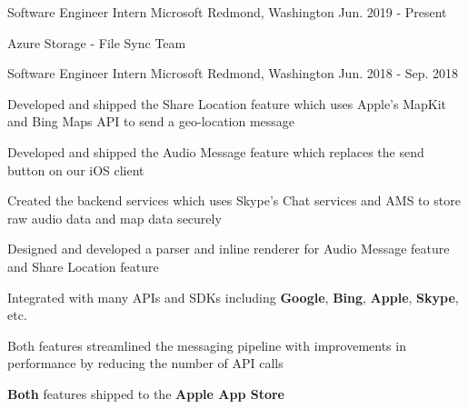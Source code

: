 


\begin{cventries}

\begin{comment}
\cventry
{Software Engineer Intern}
{Microsoft}
{Redmond, Washington}
{Jun. 2018 - Sep. 2018}
{
\begin{cvitems}
\item {Will develop on the frameworks team}
\end{cvitems}
}
\end{comment}

\cventry
	{Software Engineer Intern}
	{Microsoft}
	{Redmond, Washington}
	{Jun. 2019 - Present}
{								
	\begin{cvitems} 
                \item {Azure Storage - File Sync Team}
	\end{cvitems}
}

\cventry
	{Software Engineer Intern}
	{Microsoft}
	{Redmond, Washington}
	{Jun. 2018 - Sep. 2018}
{								
	\begin{cvitems} 
                \item {Developed and shipped the Share Location feature which uses Apple's MapKit and Bing Maps API to send a geo-location message}
                \item {Developed and shipped the Audio Message feature which replaces the send button on our iOS client}
                \item {Created the backend services which uses Skype's Chat services and AMS to store raw audio data and map data securely}
                \item {Designed and developed a parser and inline renderer for Audio Message feature and Share Location feature}
		\item {Integrated with many APIs and SDKs including \textbf{Google}, \textbf{Bing}, \textbf{Apple}, \textbf{Skype}, etc.}
                \item {Both features streamlined the messaging pipeline with improvements in performance by reducing the number of API calls}
		\item {\textbf{Both} features shipped to the \textbf{Apple App Store}}
	\end{cvitems}
}


\end{cventries}
